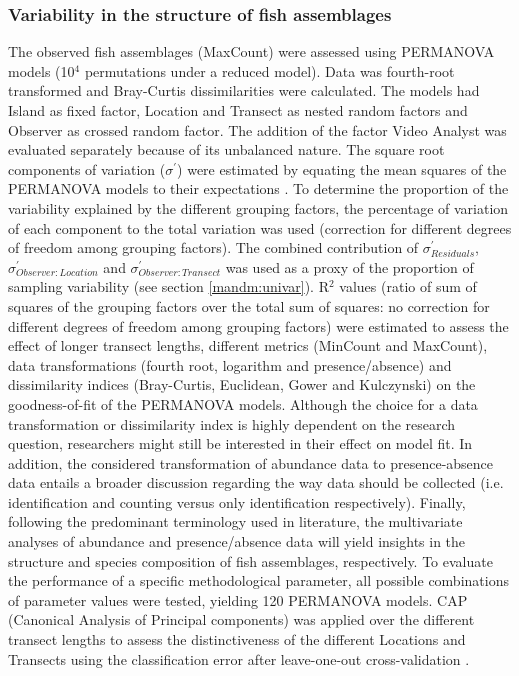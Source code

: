 \documentclass[10pt,letterpaper]{article}
\begin{document}
\subsubsection{Variability in the structure of fish assemblages}
\label{mandm:multivar}

The observed fish assemblages (MaxCount) were assessed using PERMANOVA models (10$^{4}$ permutations under a reduced model). 
Data was fourth-root transformed and Bray-Curtis dissimilarities were calculated. The models had Island as fixed factor, Location and Transect as nested random factors and Observer as crossed random factor. The addition of the factor Video Analyst was evaluated separately because of its unbalanced nature. The square root components of variation ($\sigma^{'}$) were estimated by equating the mean squares of the PERMANOVA models to their expectations \cite{Anderson2008}. To determine the proportion of the variability explained by the different grouping factors, the percentage of variation of each component to the total variation was used (correction for different degrees of freedom among grouping factors). The combined contribution of $\sigma^{'}_{Residuals}$, $\sigma^{'}_{Observer:Location}$ and $\sigma^{'}_{Observer:Transect}$ was used as a proxy of the proportion of sampling variability (see section \ref{mandm:univar}). R$^{2}$ values (ratio of sum of squares of the grouping factors over the total sum of squares: no correction for different degrees of freedom among grouping factors) were estimated to assess the effect of longer transect lengths, different metrics (MinCount and MaxCount), data transformations (fourth root, logarithm and presence/absence) and dissimilarity indices (Bray-Curtis, Euclidean, Gower and Kulczynski) on the goodness-of-fit of the PERMANOVA models. Although the choice for a data transformation or dissimilarity index is highly dependent on the research question, researchers might still be interested in their effect on model fit. In addition, the considered transformation of abundance data to presence-absence data entails a broader discussion regarding the way data should be collected (i.e. identification and counting versus only identification respectively). Finally, following the predominant terminology used in literature, the multivariate analyses of abundance and presence/absence data will yield insights in the structure and species composition of fish assemblages, respectively. To evaluate the performance of a specific methodological parameter, all possible combinations of parameter values were tested, yielding 120 PERMANOVA models. CAP (Canonical Analysis of Principal components) was applied over the different transect lengths to assess the distinctiveness of the different Locations and Transects using the classification error after leave-one-out cross-validation \cite{Anderson2003}.
\end{document}
